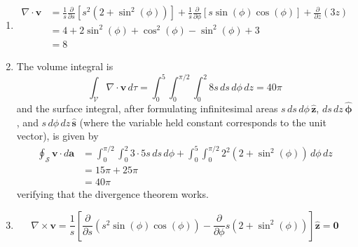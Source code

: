 \documentclass[a4paper]{article}
\begin{document}
\newpage

\begin{enumerate}[label=(\alph*)]
	\item \begin{align*}
		\nabla \cdot \pmb{v} & = \frac{1}{s}\frac{\partial }{\partial s}\!\left[ s^{2}\!\left( 2 + \sin^{2}\!\left(\phi\right) \right) \right] + \frac{1}{s}\frac{\partial }{\partial \phi}\!\left[ s \sin\!\left(\phi\right)\cos\!\left(\phi\right) \right] + \frac{\partial }{\partial z}\!\left( 3z \right) \\
				     & = 4 + 2 \sin^{2}\!\left(\phi\right) + \cos^{2}\!\left(\phi\right) - \sin^{2}\!\left(\phi\right) + 3 \\
				     & = 8
	\end{align*}
	\item The volume integral is
	\[
		\int_{\mathcal{V}}\nabla \cdot \pmb{v} \, d \tau = \int^{5}_{0} \int^{\pi / 2}_{0} \int^{2}_{0} 8s \, ds \, d \phi \, dz = 40 \pi  
	\]
	and the surface integral, after formulating infinitesimal areas \( s \, ds \, d \phi \, \pmb{\hat{z}} \), \( ds \, dz \, \pmb{\hat{\phi}} \), and \( s \, d \phi \, dz \, \pmb{\hat{s}} \) (where the variable held constant corresponds to the unit vector), is given by
	\begin{align*}
		\oint_{\mathcal{S}}\pmb{v} \cdot d \pmb{a} & = \int^{\pi / 2}_{0} \int^{2}_{0} 3 \cdot 5s \, ds \, d \phi + \int^{5}_{0} \int^{\pi / 2}_{0} 2^{2}\!\left( 2 + \sin^{2}\!\left(\phi\right) \right) \, d \phi \, dz \\
							   & = 15 \pi + 25 \pi \\
							   & = 40 \pi
	\end{align*}
	verifying that the divergence theorem works.
	\item \[
		\nabla \times \pmb{v} = \frac{1}{s}\!\left[ \frac{\partial }{\partial s}\!\left( s^{2}\sin\!\left(\phi\right)\cos\!\left(\phi\right) \right) - \frac{\partial }{\partial \phi}s \!\left( 2 + \sin^{2}\!\left(\phi\right) \right) \right]\pmb{\hat{z}} = \pmb{0}
	\]
\end{enumerate}
\end{document}
